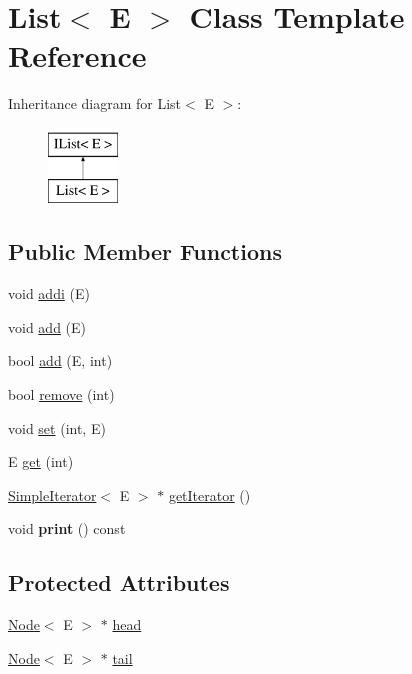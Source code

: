 \hypertarget{classList}{\section{List$<$ E $>$ Class Template Reference}
\label{classList}
}
Inheritance diagram for List$<$ E $>$\-:\begin{figure}[H]
\begin{center}
\leavevmode
\includegraphics[height=2.000000cm]{classList}
\end{center}
\end{figure}
\subsection*{Public Member Functions}
\begin{DoxyCompactItemize}
\item 
void \hyperlink{classList_a40dfa61150de7310d69001c697598b04}{addi} (E)
\item 
void \hyperlink{classList_a2a130b7bc38cd968136f1f847e42d0cc}{add} (E)
\item 
bool \hyperlink{classList_a530267346ebec244900c162de6f467e1}{add} (E, int)
\item 
bool \hyperlink{classList_a46cec78299d3e23469276adf46adf9c1}{remove} (int)
\item 
void \hyperlink{classList_ac8b31be96806bd56f655436629ac2e7a}{set} (int, E)
\item 
E \hyperlink{classList_ab081a52d7a62aa6c5550ff9762f9427f}{get} (int)
\item 
\hyperlink{classSimpleIterator}{Simple\-Iterator}$<$ E $>$ $\ast$ \hyperlink{classList_accb5fe71cb60ba7bf0ccab362b1f87cb}{get\-Iterator} ()
\item 
\hypertarget{classList_ad2201bc77b15291f215523ecc96705dc}{void {\bfseries print} () const }\label{classList_ad2201bc77b15291f215523ecc96705dc}

\end{DoxyCompactItemize}
\subsection*{Protected Attributes}
\begin{DoxyCompactItemize}
\item 
\hyperlink{classNode}{Node}$<$ E $>$ $\ast$ \hyperlink{classList_ae3829eca87a5040cca1ae9e0dc40b768}{head}
\item 
\hyperlink{classNode}{Node}$<$ E $>$ $\ast$ \hyperlink{classList_a6008ce8286d474397d0ce5847f819783}{tail}
\end{DoxyCompactItemize}


